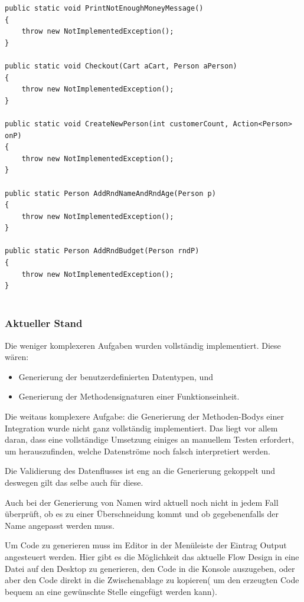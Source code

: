 \begin{lstlisting}[caption=Shopping Simulator - automatisch generierter Code mit Dexel]
public static void PrintNotEnoughMoneyMessage()
{
    throw new NotImplementedException();
}

public static void Checkout(Cart aCart, Person aPerson)
{
    throw new NotImplementedException();
}

public static void CreateNewPerson(int customerCount, Action<Person> onP)
{
    throw new NotImplementedException();
}

public static Person AddRndNameAndRndAge(Person p)
{
    throw new NotImplementedException();
}

public static Person AddRndBudget(Person rndP)
{
    throw new NotImplementedException();
}


\end{lstlisting}

\subsubsection{Aktueller Stand}

Die weniger komplexeren Aufgaben wurden vollständig implementiert.
Diese wären: 
\begin{itemize}
	\item Generierung der benutzerdefinierten Datentypen, und 
	\item Generierung der Methodensignaturen einer Funktionseinheit.
\end{itemize}

Die weitaus komplexere Aufgabe: die Generierung der Methoden-Bodys einer Integration wurde nicht ganz vollständig implementiert.
Das liegt vor allem daran, dass eine vollständige Umsetzung einiges an manuellem Testen erfordert, um herauszufinden, welche Datenströme noch falsch interpretiert werden. 

Die Validierung des Datenflusses ist eng an die Generierung gekoppelt und deswegen gilt das selbe auch für diese. 

Auch bei der Generierung von Namen wird aktuell noch nicht in jedem Fall überprüft, ob es zu einer Überschneidung kommt und ob gegebenenfalls der Name angepasst werden muss.

\bigskip

Um Code zu generieren muss im Editor in der Menüleiste der Eintrag Output angesteuert werden.
Hier gibt es die Möglichkeit das aktuelle Flow Design in eine Datei auf den Desktop zu
generieren, den Code in die Konsole auszugeben, oder aber den Code direkt in die Zwischenablage zu kopieren( um den erzeugten Code bequem an eine gewünschte Stelle eingefügt werden kann).

